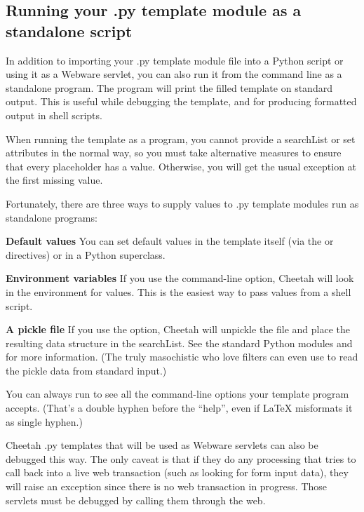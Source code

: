 \subsection{Running your .py template module as a standalone script}
\label{howWorks.standalone}

In addition to importing your .py template module file into a Python
script or using it as a Webware servlet, you can also run it from the
command line as a standalone program.  The program will print the filled
template on standard output.  This is useful while debugging the template,
and for producing formatted output in shell scripts.

When running the template as a program, you cannot provide a searchList or
set  attributes in the normal way, so you must take
alternative measures to ensure that every placeholder has a value.
Otherwise, you will get the usual  exception at
the first missing value.

Fortunately, there are three ways to supply values to .py template modules
run as standalone programs:

\begin{description}
\item{{\bf Default values}}  You can set default values in the template itself
     (via the  or  directives) or in a Python
     superclass.
\item{{\bf Environment variables}} If you use the  command-line
option, Cheetah will look in the environment for values.  This is the easiest
way to pass values from a shell script.
\item{{\bf A pickle file}}  If you use the  option, 
     Cheetah will unpickle the file and place the resulting data structure in
     the searchList.    See the standard Python modules  and
      for more information.  (The truly masochistic who love
     filters can even use  to read the pickle data from
     standard input.)
\end{description}

You can always run  to see all the command-line
options your template program accepts.  (That's a double hyphen before the
``help'', even if LaTeX misformats it as single hyphen.)

Cheetah .py templates that will be used as Webware servlets can also be 
debugged this way.  The only caveat is that if they do any processing that
tries to call back into a live web transaction (such as looking for form
input data), they will raise an exception since there is no web transaction
in progress.  Those servlets must be debugged by calling them through the
web.

